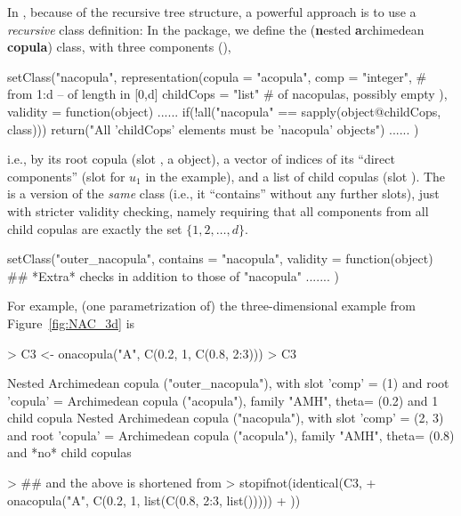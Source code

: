 \documentclass[nojss,article]{jss}
\theoremstyle{mythmstyle}
\newcommand*{\R}{\proglang{R}}%
\begin{document}
In \R, because of the recursive tree structure, a powerful approach is to
use a \emph{recursive} class definition: In the  package, we
define the  (\textbf{n}ested \textbf{a}rchimedean
\textbf{copula}) class, with three components (),
\begin{Schunk}
%% manual cut & paste from ../../R/AllClass.R :
\begin{Sinput}
setClass("nacopula",
	 representation(copula    = "acopula",
                        comp      = "integer",  # from 1:d -- of length in [0,d]
                        childCops = "list" # of nacopulas, possibly empty
                       ),
         validity = function(object) {
            ......
             if(!all("nacopula" == sapply(object@childCops, class)))
                 return("All 'childCops' elements must be 'nacopula' objects")
            ......
         })
\end{Sinput}
\end{Schunk}
i.e., by its root copula (slot , a  object),
a vector of indices of its ``direct components'' (slot 
for $u_1$ in the example), and a list of child copulas (slot ).
The  is a version of the \emph{same} class (i.e., it
``contains''  without any further slots), just with
stricter validity checking, namely requiring that all components from all
child copulas are exactly the set $\{1,2,\dots,d\}$.
\begin{Schunk}
\begin{Sinput}
setClass("outer_nacopula", contains = "nacopula",
         validity = function(object) {
             ## *Extra* checks in addition to those of "nacopula"
             .......
        })
\end{Sinput}
\end{Schunk}
For example, (one parametrization of) the three-dimensional example from
Figure~\ref{fig:NAC_3d} is
\begin{Schunk}
\begin{Sinput}
> C3 <- onacopula("A", C(0.2, 1, C(0.8, 2:3)))
> C3
\end{Sinput}
\begin{Soutput}
Nested Archimedean copula ("outer_nacopula"), with slot 
'comp'   = (1)  and root
'copula' = Archimedean copula ("acopula"), family "AMH", theta= (0.2)
and 1 child copula
   Nested Archimedean copula ("nacopula"), with slot 
   'comp'   = (2, 3)  and root
   'copula' = Archimedean copula ("acopula"), family "AMH", theta= (0.8)
   and *no* child copulas
\end{Soutput}
\begin{Sinput}
> ## and the above is shortened from
> stopifnot(identical(C3,
+       onacopula("A", C(0.2, 1, list(C(0.8, 2:3, list()))))
+ ))
\end{Sinput}
\end{Schunk}
\end{document}
